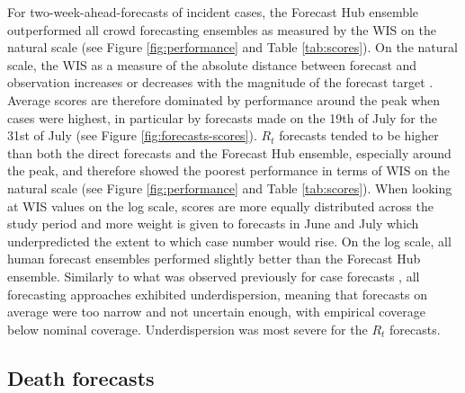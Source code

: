 \documentclass[10pt,a4paper,twocolumn]{article}
\begin{document}
For two-week-ahead-forecasts of incident cases, the Forecast Hub ensemble outperformed all crowd forecasting ensembles as measured by the WIS on the natural scale (see Figure \ref{fig:performance} and Table \ref{tab:scores}). On the natural scale, the WIS as a measure of the absolute distance between forecast and observation increases or decreases with the magnitude of the forecast target \cite{bosseTransformationForecastsEvaluating2023, bracherEvaluatingEpidemicForecasts2021}. Average scores are therefore dominated by performance around the peak when cases were highest, in particular by forecasts made on the 19th of July for the 31st of July (see Figure \ref{fig:forecasts-scores}). $R_t$ forecasts tended to be higher than both the direct forecasts and the Forecast Hub ensemble, especially around the peak, and therefore showed the poorest performance in terms of WIS on the natural scale (see Figure \ref{fig:performance} and Table \ref{tab:scores}). When looking at WIS values on the log scale,
scores are more equally distributed across the study period and more weight is given to forecasts in June and July which underpredicted the extent to which case number would rise. On the log scale, all human forecast ensembles performed slightly better than the Forecast Hub ensemble. Similarly to what was observed previously for case forecasts \citep{bosseComparingHumanModelbased2022, sherrattPredictivePerformanceMultimodel2022a}, all forecasting approaches exhibited underdispersion, meaning that forecasts on average were too narrow and not uncertain enough, with empirical coverage below nominal coverage. Underdispersion was most severe for the $R_t$ forecasts. 



\subsection*{Death forecasts} 
\end{document}
